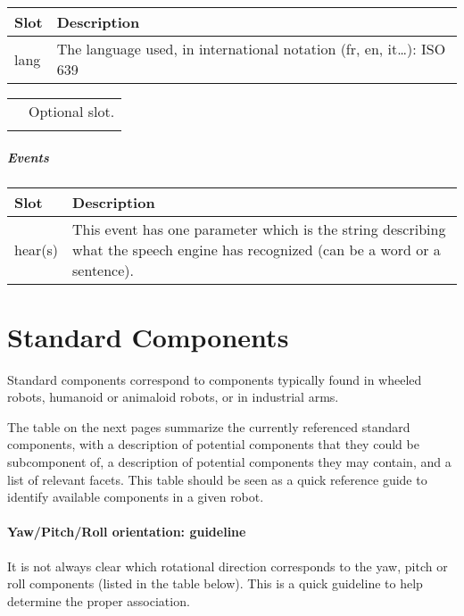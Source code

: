 \documentclass[a4paper]{article}
\begin{document}
\begin{flushleft}
\tablehead{}
\begin{supertabular}{|m{3.293cm}|m{11.997cm}|}
\hline
\sffamily\bfseries Slot &
\sffamily\bfseries Description\\\hline
lang &
\sffamily The language used, in international
notation (fr, en, it…): ISO 639\\\hline
\end{supertabular}
\end{flushleft}
\begin{flushleft}
\tablehead{}
\begin{supertabular}{|m{1.717cm}|m{10.464cm}}
\hhline{-~}
 &
\sffamily Optional slot.\\\hhline{-~}
\end{supertabular}
\end{flushleft}
\subparagraph{Events}

\begin{flushleft}
\tablehead{}
\begin{supertabular}{|m{3.293cm}|m{11.997cm}|}
\hline
\sffamily\bfseries Slot &
\sffamily\bfseries Description\\\hline
hear(s) &
\sffamily This event has one parameter which is
the string describing what the speech engine has recognized (can be a
word or a sentence).\\\hline
\end{supertabular}
\end{flushleft}
\section[Standard Components]{Standard
Components}
{\sffamily
Standard components correspond to components typically found in wheeled
robots, humanoid or animaloid robots, or in industrial arms. }

{\sffamily
The table on the next pages summarize the currently referenced standard
components, with a description of potential components that they could
be subcomponent of, a description of potential components they may
contain, and a list of relevant facets. This table should be seen as a
quick reference guide to identify available components in a given
robot.}

\paragraph{Yaw/Pitch/Roll orientation: guideline}

{\sffamily
It is not always clear which rotational direction corresponds to the
yaw, pitch or roll components (listed in the table below). This is a
quick guideline to help determine the proper association. }
\end{document}
